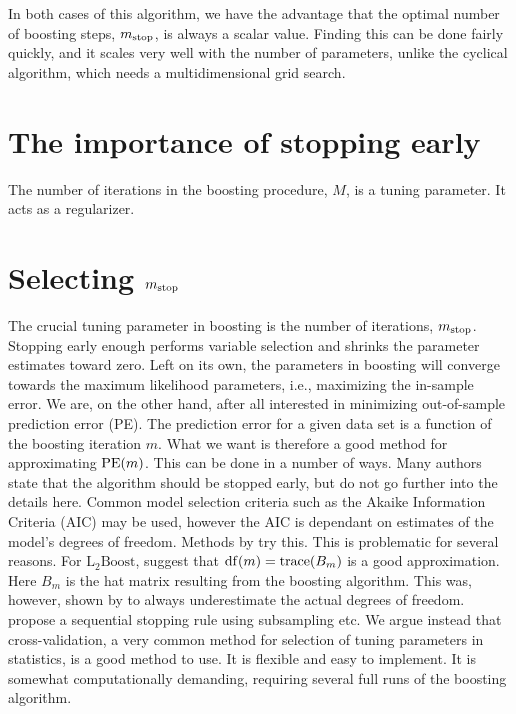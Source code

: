 In both cases of this algorithm, we have the advantage that the optimal number of boosting steps, $m_{\text{stop}}$, is always a scalar value. Finding this can be done fairly quickly, and it scales very well with the number of parameters, unlike the cyclical algorithm, which needs a multidimensional grid search.


\section{The importance of stopping early}
The number of iterations in the boosting procedure, $M$, is a tuning parameter. It acts as a regularizer.

\section{Selecting $m_{\text{stop}}$}
The crucial tuning parameter in boosting is the number of iterations, $m_{\text{stop}}$. Stopping early enough performs variable selection and shrinks the parameter estimates toward zero. Left on its own, the parameters in boosting will converge towards the maximum likelihood parameters, i.e., maximizing the in-sample error. We are, on the other hand, after all interested in minimizing out-of-sample prediction error (PE). The prediction error for a given data set is a function of the boosting iteration $m$. What we want is therefore a good method for approximating $\operatorname{PE}(m)$. This can be done in a number of ways. Many authors state that the algorithm should be stopped early, but do not go further into the details here. Common model selection criteria such as the Akaike Information Criteria (AIC) may be used, however the AIC is dependant on estimates of the model's degrees of freedom. Methods by \citet{chang2010} try this. This is problematic for several reasons. For $\text{L}_2\text{Boost}$, \citet{buhlmann2007} suggest that $\operatorname{df}(m)=\operatorname{trace}(B_m)$ is a good approximation. Here $B_m$ is the hat matrix resulting from the boosting algorithm. This was, however, shown by \citet{hastie2007} to always underestimate the actual degrees of freedom. \citet{mayr-hofner} propose a sequential stopping rule using subsampling etc. We argue instead that cross-validation, a very common method for selection of tuning parameters in statistics, is a good method to use. It is flexible and easy to implement. It is somewhat computationally demanding, requiring several full runs of the boosting algorithm.

